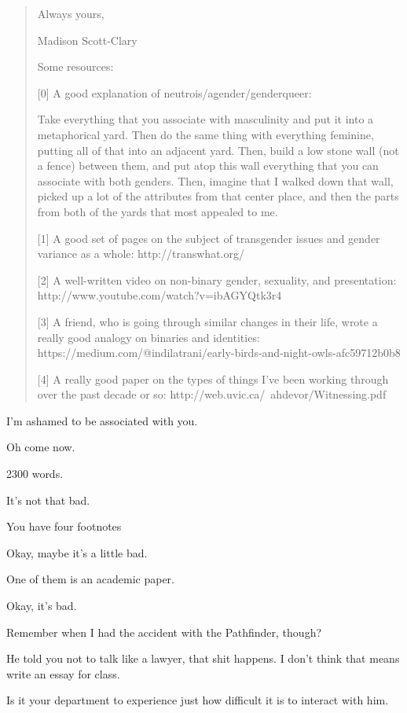 \begin{paracol}{2}
\begin{leftcolumn}
\begin{quotation}
Always yours,

Madison Scott-Clary

Some resources:

[0] A good explanation of neutrois/agender/genderqueer:

    Take everything that you associate with masculinity and put it into a metaphorical yard. Then do the same thing with everything feminine, putting all of that into an adjacent yard. Then, build a low stone wall (not a fence) between them, and put atop this wall everything that you can associate with both genders. Then, imagine that I walked down that wall, picked up a lot of the attributes from that center place, and then the parts from both of the yards that most appealed to me.

[1] A good set of pages on the subject of transgender issues and gender variance as a whole: http://transwhat.org/

[2] A well-written video on non-binary gender, sexuality, and presentation: http://www.youtube.com/watch?v=ibAGYQtk3r4

[3] A friend, who is going through similar changes in their life, wrote a really good analogy on binaries and identities: https://medium.com/@indilatrani/early-birds-and-night-owls-afc59712b0b8

[4] A really good paper on the types of things I've been working through over the past decade or so: http://web.uvic.ca/~ahdevor/Witnessing.pdf
\end{quotation}

\begin{ally}
I'm ashamed to be associated with you.
\end{ally}
Oh come now.

\begin{ally}
2300 words.
\end{ally}
It's not that bad.

\begin{ally}
You have four footnotes
\end{ally}
Okay, maybe it's a little bad.

\begin{ally}
One of them is an academic paper.
\end{ally}
Okay, it's bad.

Remember when I had the accident with the Pathfinder, though?

\begin{ally}
He told you not to talk like a lawyer, that shit happens. I don't think that means write an essay for class.
\end{ally}
Is it your department to experience just how difficult it is to interact with him.


\end{leftcolumn}
\end{paracol}
